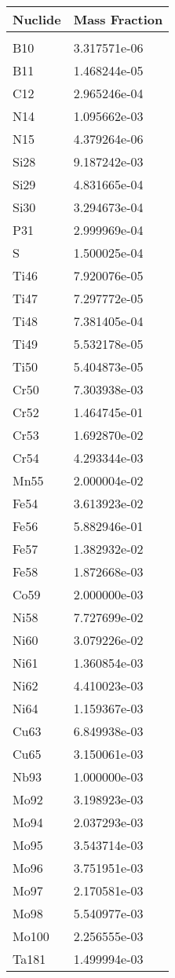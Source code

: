 \begin{centering}
\begin{longtable}[ht!]
\caption{Table showing the isotopic description of material M101}
\label{table:material_M101}
\end{longtable}\clearpage

\begin{longtable}[ht!]
{ p{} | p{} }
\hline
Nuclide & Mass Fraction\\
\hline
\\
B10 & 3.317571e-06\\
B11 & 1.468244e-05\\
C12 & 2.965246e-04\\
N14 & 1.095662e-03\\
N15 & 4.379264e-06\\
Si28 & 9.187242e-03\\
Si29 & 4.831665e-04\\
Si30 & 3.294673e-04\\
P31 & 2.999969e-04\\
S & 1.500025e-04\\
Ti46 & 7.920076e-05\\
Ti47 & 7.297772e-05\\
Ti48 & 7.381405e-04\\
Ti49 & 5.532178e-05\\
Ti50 & 5.404873e-05\\
Cr50 & 7.303938e-03\\
Cr52 & 1.464745e-01\\
Cr53 & 1.692870e-02\\
Cr54 & 4.293344e-03\\
Mn55 & 2.000004e-02\\
Fe54 & 3.613923e-02\\
Fe56 & 5.882946e-01\\
Fe57 & 1.382932e-02\\
Fe58 & 1.872668e-03\\
Co59 & 2.000000e-03\\
Ni58 & 7.727699e-02\\
Ni60 & 3.079226e-02\\
Ni61 & 1.360854e-03\\
Ni62 & 4.410023e-03\\
Ni64 & 1.159367e-03\\
Cu63 & 6.849938e-03\\
Cu65 & 3.150061e-03\\
Nb93 & 1.000000e-03\\
Mo92 & 3.198923e-03\\
Mo94 & 2.037293e-03\\
Mo95 & 3.543714e-03\\
Mo96 & 3.751951e-03\\
Mo97 & 2.170581e-03\\
Mo98 & 5.540977e-03\\
Mo100 & 2.256555e-03\\
Ta181 & 1.499994e-03\\


\end{longtable}
\end{centering}
